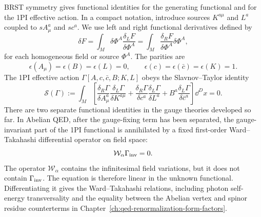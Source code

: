 BRST symmetry gives functional identities for the generating functional and
for the 1PI effective action.  In a compact notation, introduce sources
\(K^{a\mu}\) and \(L^a\) coupled to \(sA_\mu^a\) and \(sc^a\).  We use left
and right functional derivatives defined by
\[
  \delta F
  =
  \int_M \delta\Phi^A
  \frac{\delta_L F}{\delta\Phi^A}
  =
  \int_M
  \frac{\delta_R F}{\delta\Phi^A}\delta\Phi^A,
\]
for each homogeneous field or source \(\Phi^A\).  The parities are
\[
  \epsilon(A_\mu)=\epsilon(B)=\epsilon(L)=0,
  \qquad
  \epsilon(c)=\epsilon(\bar c)=\epsilon(K)=1 .
\]
The 1PI effective action \(\Gamma[A,c,\bar c,B;K,L]\) obeys the
Slavnov--Taylor identity
\begin{equation}
  \mathcal S(\Gamma)
  :=
  \int_M
  \left[
  \frac{\delta_R\Gamma}{\delta A_\mu^a}
  \frac{\delta_L\Gamma}{\delta K^{a\mu}}
  +
  \frac{\delta_R\Gamma}{\delta c^a}
  \frac{\delta_L\Gamma}{\delta L^a}
  +
  B^a\frac{\delta_L\Gamma}{\delta\bar c^a}
  \right]\dd^D x
  =
  0 .
  \label{eq:slavnov-taylor-identity}
\end{equation}
There are two separate functional identities in the gauge theories developed
so far.  In Abelian QED, after the gauge-fixing term has been separated, the
gauge-invariant part of the 1PI functional is annihilated by a fixed
first-order Ward--Takahashi differential operator on field space:
\[
  \mathcal W_\alpha\Gamma_{\rm inv}=0 .
\]
The operator \(\mathcal W_\alpha\) contains the infinitesimal field
variations, but it does not contain \(\Gamma_{\rm inv}\).  The equation is
therefore linear in the unknown functional.  Differentiating it gives the
Ward--Takahashi relations, including photon self-energy transversality
and the equality between the Abelian vertex and spinor residue counterterms
in Chapter~\ref{ch:qed-renormalization-form-factors}.

